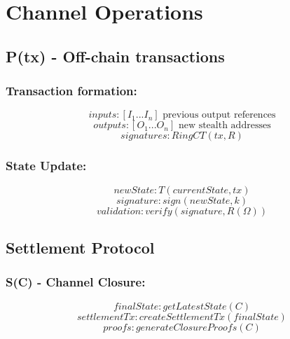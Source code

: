 \documentclass[11pt]{amsart}
\begin{document}
\section{Channel Operations}

\subsection{P(tx) - Off-chain transactions} 

\subsubsection{Transaction formation:}
\begin{equation*}
	inputs: [I_1...I_n] \text{ previous output references}
\end{equation*}
\begin{equation*}
	outputs: [O_1...O_n] \text{ new stealth addresses}
\end{equation*}
\begin{equation*}
	signatures: RingCT(tx, R)
\end{equation*}

\subsubsection{State Update:}
\begin{equation*}
	newState: T(currentState, tx)
\end{equation*}
\begin{equation*}
	signature: sign(newState, k)
\end{equation*}
\begin{equation*}
	validation: verify(signature, R(\Omega))
\end{equation*}

\subsection{Settlement Protocol} 

\subsubsection{S(C) - Channel Closure:}
\begin{equation*}
	finalState: getLatestState(C)
\end{equation*}
\begin{equation*}
	settlementTx: createSettlementTx(finalState)
\end{equation*}
\begin{equation*}
	proofs: generateClosureProofs(C)
\end{equation*}
\end{document}
